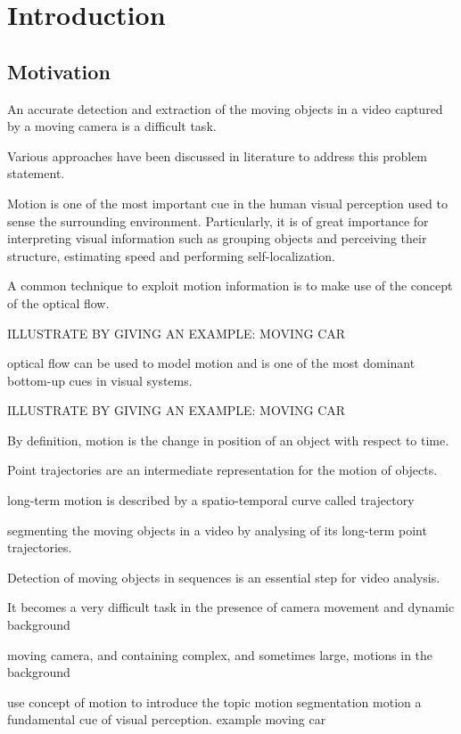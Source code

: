 \chapter{Introduction}
\section{Motivation}

An accurate detection and extraction of the moving objects in a video captured by a moving camera is a difficult task. 

Various approaches have been discussed in literature to address this problem statement.



Motion is one of the most important cue in the human visual perception used to sense the surrounding environment. Particularly, it is of great importance for interpreting visual information such as grouping objects and perceiving their structure, estimating speed and performing self-localization.

A common technique to exploit motion information is to make use of the concept of the optical flow.

ILLUSTRATE BY GIVING AN EXAMPLE: MOVING CAR



optical flow can be used to model motion and is one of the most dominant bottom-up cues in visual systems.


ILLUSTRATE BY GIVING AN EXAMPLE: MOVING CAR


By definition, motion is the change in position of an object with respect to time. 



Point trajectories are an intermediate representation for the motion of objects.

long-term motion is described by a spatio-temporal curve called trajectory


segmenting the moving objects in a video by analysing of its long-term point trajectories.

Detection of moving objects in sequences is an essential step for video analysis.

It  becomes  a  very  difficult  task  in  the  presence  of  camera  movement and  dynamic background

moving camera, and containing complex, and sometimes large, motions in
the background

use concept of motion to introduce the topic motion segmentation
motion a fundamental cue of visual perception.
example moving car


